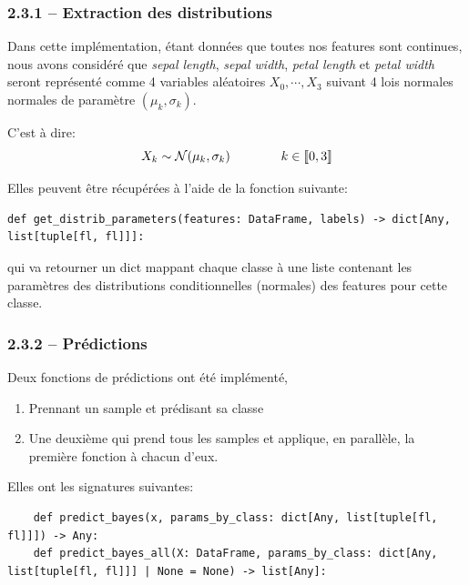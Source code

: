 \documentclass[
]{article}
\providecommand{\tightlist}{%
  \setlength{\itemsep}{0pt}\setlength{\parskip}{0pt}}
\begin{document}
\hypertarget{extraction-des-distributions}{%
\subsubsection{2.3.1 -- Extraction des
distributions}\label{extraction-des-distributions}}

Dans cette implémentation, étant données que toutes nos features sont
continues, nous avons considéré que \emph{sepal length}, \emph{sepal
width}, \emph{petal length} et \emph{petal width} seront représenté
comme 4 variables aléatoires \(X_0, \cdots, X_3\) suivant 4 lois
normales normales de paramètre \((\mu_k, \sigma_k)\).

C'est à dire: \[
X_k \sim \mathcal{N}( \mu_k, \sigma_k) \qquad \qquad k \in \llbracket{0, 3}\rrbracket
\]

Elles peuvent être récupérées à l'aide de la fonction suivante:

\begin{lstlisting}
def get_distrib_parameters(features: DataFrame, labels) -> dict[Any, list[tuple[fl, fl]]]:
\end{lstlisting}

qui va retourner un dict mappant chaque classe à une liste contenant les
paramètres des distributions conditionnelles (normales) des features
pour cette classe.

\hypertarget{pruxe9dictions-1}{%
\subsubsection{2.3.2 -- Prédictions}\label{pruxe9dictions-1}}

Deux fonctions de prédictions ont été implémenté,

\begin{enumerate}
\def\labelenumi{\arabic{enumi}.}
\tightlist
\item
  Prennant un sample et prédisant sa classe
\item
  Une deuxième qui prend tous les samples et applique, en parallèle, la
  première fonction à chacun d'eux.
\end{enumerate}

Elles ont les signatures suivantes:

\begin{lstlisting}
    def predict_bayes(x, params_by_class: dict[Any, list[tuple[fl, fl]]]) -> Any:
    def predict_bayes_all(X: DataFrame, params_by_class: dict[Any, list[tuple[fl, fl]]] | None = None) -> list[Any]:
\end{lstlisting}
\end{document}
